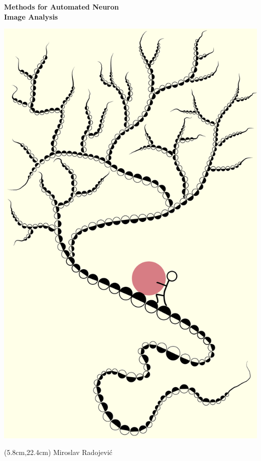 %
%
\setlength{\parindent}{0pt}
\thispagestyle{empty}

\afterpage{\restorepagecolor} %

\vspace*{-2cm}
\begin{changemargin}{-0.5cm}{-0.5cm}

\begin{center}
	{\Huge\bf Methods for Automated Neuron \\[1ex] Image Analysis \\[2.2ex]}
\end{center}

\begin{center}
	\includegraphics[height=1.15\linewidth]{./cover/syziphus}
\end{center}

\begin{textblock*}{\textwidth}(5.8cm,22.4cm)
	{\Huge Miroslav Radojevi\'{c}}
\end{textblock*}

\end{changemargin}

